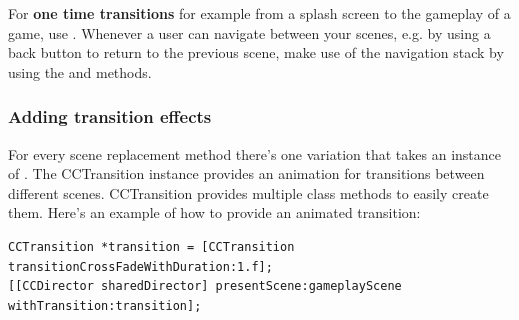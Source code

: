 \begin{bestpractice}[frametitle={Scene transitions - the right way}] 
For \textbf{one time transitions} for example from a splash screen to the
gameplay of a game, use . Whenever a user can navigate
between your scenes, e.g. by using a back button to return to the previous
scene, make use of the navigation stack by using the  and
 methods.
\end{bestpractice}

\subsubsection{Adding transition effects}
For every scene replacement method there's one variation that takes an instance
of . The CCTransition instance provides an animation
for transitions between different scenes. CCTransition provides multiple class
methods to easily create them. Here's an example of how to provide an animated
transition:
\begin{lstlisting}
CCTransition *transition = [CCTransition transitionCrossFadeWithDuration:1.f];
[[CCDirector sharedDirector] presentScene:gameplayScene
withTransition:transition];
\end{lstlisting}

